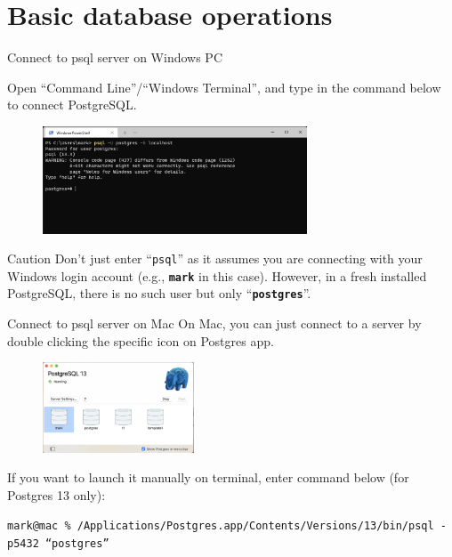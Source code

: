 \section*{Basic database operations}

\begin{frame}[fragile]{Connect to psql server on Windows PC}

Open ``Command Line''/``Windows Terminal'', and type in the command below to connect PostgreSQL.
\begin{figure}
	\includegraphics[width=0.7\textwidth]{t0-psql/images/1.png}
\end{figure}

\begin{alertblock}{Caution}
	Don't just enter ``\texttt{psql}'' as it assumes you are connecting with your Windows login account (e.g., \texttt{\textbf{mark}} in this case). However, in a fresh installed PostgreSQL, there is no such user but only ``\texttt{\textbf{postgres}}''. 
\end{alertblock}

\end{frame}

\begin{frame}[fragile]{Connect to psql server on Mac}
	On Mac, you can just connect to a server by double clicking the specific icon on Postgres app. \vspace{5pt}
	\begin{figure}
		\includegraphics[width=0.4\textwidth]{t0-psql/images/mac1.png}
	\end{figure}

	If you want to launch it manually on terminal, enter command below (for Postgres 13 only):
	
	{\scriptsize \texttt{mark@mac \% /Applications/Postgres.app/Contents/Versions/13/bin/psql -p5432 ``postgres''}}
\end{frame}

